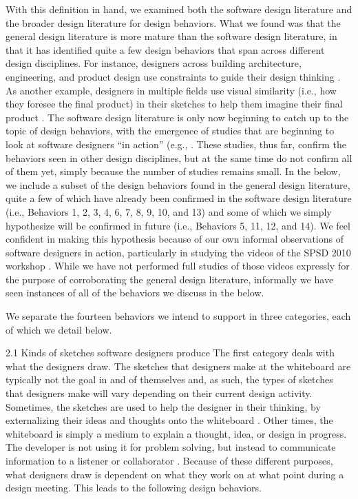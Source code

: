With this definition in hand, we examined both the software design literature and the broader design literature for design behaviors. What we found was that the general design literature is more mature than the software design literature, in that it has identified quite a few design behaviors that span across different design disciplines. For instance, designers across building architecture, engineering, and product design use constraints to guide their design thinking \cite{cross2007designerly}. As another example, designers in multiple fields use visual similarity (i.e., how they foresee the final product) in their sketches to help them imagine their final product \cite{do1998right}.  
The software design literature is only now beginning to catch up to the topic of design behaviors, with the emergence of studies that are beginning to look at software designers “in action” (e.g., \cite{baker2012guest,cherubini2007let,dekel2007notation,petre2009insights}. These studies, thus far, confirm the behaviors seen in other design disciplines, but at the same time do not confirm all of them yet, simply because the number of studies remains small. In the below, we include a subset of the design behaviors found in the general design literature, quite a few of which have already been confirmed in the software design literature (i.e., Behaviors 1, 2, 3, 4, 6, 7, 8, 9, 10, and 13) and some of which we simply hypothesize will be confirmed in future (i.e., Behaviors 5, 11, 12, and 14).  We feel confident in making this hypothesis because of our own informal observations of software designers in action, particularly in studying the videos of the SPSD 2010 workshop \cite{baker2012guest}. While we have not performed full studies of those videos expressly for the purpose of corroborating the general design literature, informally we have seen instances of all of the behaviors we discuss in the below. 

We separate the fourteen behaviors we intend to support in three categories, each of which we detail below.

2.1	Kinds of sketches software designers produce
The first category deals with what the designers draw. The sketches that designers make at the whiteboard are typically not the goal in and of themselves and, as such, the types of sketches that designers make will vary depending on their current design activity. Sometimes, the sketches are used to help the designer in their thinking, by externalizing their ideas and thoughts onto the whiteboard \cite{lawson1994design}. Other times, the whiteboard is simply a medium to explain a thought, idea, or design in progress. The developer is not using it for problem solving, but instead to communicate information to a listener or collaborator \cite{eugene1992engineering}. Because of these different purposes, what designers draw is dependent on what they work on at what point during a design meeting. This leads to the following design behaviors.

